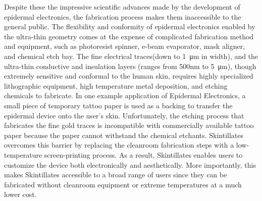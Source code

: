 \documentclass{sigchi}
\begin{document}
Despite these the impressive scientific advances made by the development of epidermal electronics, the fabrication process makes them inaccessible to the general public. The flexibility and conformity of epidermal electronics enabled by the ultra-thin geometry comes at the expense of complicated fabrication method and equipment, such as photoresist spinner, e-beam evaporator, mask aligner, and chemical etch bay\cite{Kim:2011bv}. The fine electrical traces(down to \SI{1}{\micro\metre} in width), and the ultra-thin conductive and insulation layers (ranges from 500nm to 5\SI{}{\micro\metre}), though extremely sensitive and conformal to the human skin, requires highly specialized lithographic equipment, high temperature metal deposition, and etching chemicals to fabricate\cite{Kim:2011bv,Kim:2014iq}. In one example application of Epidermal Electronics, a small piece of temporary tattoo paper is used as a backing to transfer the epidermal device onto the user's skin\cite{Kim:2011bv}. Unfortunately, the etching process that fabricates the fine gold traces is incompatible with commercially available tattoo paper because the paper cannot withstand the chemical etchants. Skintillates overcomes this barrier by replacing the cleanroom fabrication steps with a low-temperature screen-printing process. As a result, Skintillates enables users to customize the device both electronically and aesthetically.  More importantly, this makes Skintillates accessible to a broad range of users since they can be fabricated without cleanroom equipment or extreme temperatures at a much lower cost. 
\end{document}
